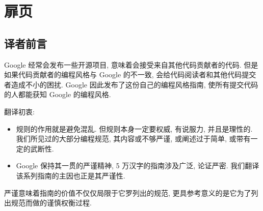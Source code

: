 \chapter{扉页}

\section{译者前言}

Google 经常会发布一些开源项目, 意味着会接受来自其他代码贡献者的代码. 但是如果代码贡献者的编程风格与 Google 的不一致,
会给代码阅读者和其他代码提交者造成不小的困扰. Google 因此发布了这份自己的编程风格指南, 使所有提交代码的人都能获知 Google
的编程风格.

翻译初衷:

\begin{itemize}
	\item 规则的作用就是避免混乱. 但规则本身一定要权威, 有说服力, 并且是理性的. 我们所见过的大部分编程规范, 其内容或不够严谨,   或阐述过于简单, 或带有一定的武断性.
	\item Google 保持其一贯的严谨精神, 5 万汉字的指南涉及广泛, 论证严密. 我们翻译该系列指南的主因也正是其严谨性.
\end{itemize}

严谨意味着指南的价值不仅仅局限于它罗列出的规范, 更具参考意义的是它为了列出规范而做的谨慎权衡过程.
